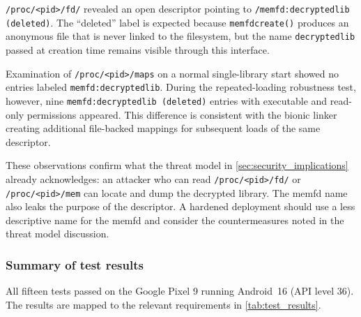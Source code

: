 \documentclass[11pt,a4paper]{report}
\renewcommand\_{{\textunderscore\allowbreak}}
\begin{document}
\texttt{/proc/<pid>/fd/} revealed an open descriptor pointing to \texttt{/memfd:decrypted\_lib (deleted)}. The ``deleted'' label is expected because \texttt{memfd\_create()} produces an anonymous file that is never linked to the filesystem, but the name \texttt{decrypted\_lib} passed at creation time remains visible through this interface.

Examination of \texttt{/proc/<pid>/maps} on a normal single-library start showed no entries labeled \texttt{memfd:decrypted\_lib}. During the repeated-loading robustness test, however, nine \texttt{memfd:decrypted\_lib (deleted)} entries with executable and read-only permissions appeared. This difference is consistent with the bionic linker creating additional file-backed mappings for subsequent loads of the same descriptor.

These observations confirm what the threat model in \cref{sec:security_implications} already acknowledges: an attacker who can read \texttt{/proc/<pid>/fd/} or \texttt{/proc/<pid>/mem} can locate and dump the decrypted library. The memfd name also leaks the purpose of the descriptor. A hardened deployment should use a less descriptive name for the memfd and consider the countermeasures noted in the threat model discussion.

\subsubsection{Summary of test results}

All fifteen tests passed on the Google Pixel 9 running Android~16 (API level 36). The results are mapped to the relevant requirements in \cref{tab:test_results}.
\end{document}

